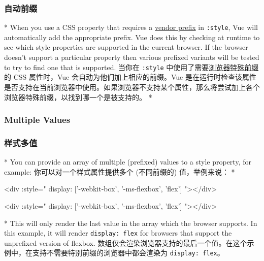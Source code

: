 \begin{paracol}{2}
\subsubsection{自动前缀}
\switchcolumn[0]*%
When you use a CSS property that requires a
\href{https://developer.mozilla.org/en-US/docs/Glossary/Vendor_Prefix}{vendor
prefix} in \texttt{:style}, Vue will automatically add the appropriate
prefix. Vue does this by checking at runtime to see which style
properties are supported in the current browser. If the browser doesn't
support a particular property then various prefixed variants will be
tested to try to find one that is supported.
\switchcolumn
当你在 \texttt{:style}
中使用了需要\href{https://developer.mozilla.org/en-US/docs/Glossary/Vendor_Prefix}{浏览器特殊前缀}的
CSS 属性时，Vue 会自动为他们加上相应的前缀。Vue
是在运行时检查该属性是否支持在当前浏览器中使用。如果浏览器不支持某个属性，那么将尝试加上各个浏览器特殊前缀，以找到哪一个是被支持的。
\switchcolumn[0]*%
\subsubsection{Multiple Values}
\switchcolumn
\subsubsection{样式多值}
\switchcolumn[0]*%
You can provide an array of multiple (prefixed) values to a style
property, for example:
\switchcolumn
你可以对一个样式属性提供多个 (不同前缀的) 值，举例来说：
\switchcolumn[0]*%
\begin{codeHtml}
<div :style="{ display: ['-webkit-box', '-ms-flexbox', 'flex'] }"></div>
\end{codeHtml}
\switchcolumn
\begin{codeHtml}
<div :style="{ display: ['-webkit-box', '-ms-flexbox', 'flex'] }"></div>
\end{codeHtml}
\switchcolumn[0]*%
This will only render the last value in the array which the browser
supports. In this example, it will render \texttt{display:\ flex} for
browsers that support the unprefixed version of flexbox.
\switchcolumn
数组仅会渲染浏览器支持的最后一个值。在这个示例中，在支持不需要特别前缀的浏览器中都会渲染为
\texttt{display:\ flex}。
\end{paracol}

